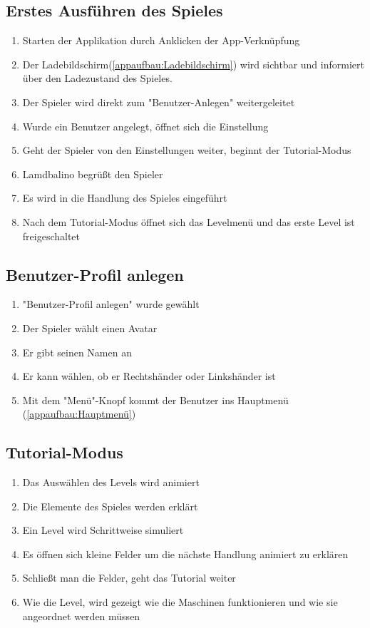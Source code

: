 \documentclass{scrartcl}
\begin{document}
\subsection{Erstes Ausführen des Spieles}
	\begin{enumerate}
		\item Starten der Applikation durch Anklicken der App-Verknüpfung
		\item Der Ladebildschirm(\ref{appaufbau:Ladebildschirm}) wird sichtbar und informiert über den Ladezustand des Spieles.
		\item Der Spieler wird direkt zum "Benutzer-Anlegen"  weitergeleitet
		\item Wurde ein Benutzer angelegt, öffnet sich die Einstellung
		\item Geht der Spieler von den Einstellungen weiter, beginnt der Tutorial-Modus
		\item Lamdbalino begrüßt den Spieler
		\item Es wird in die Handlung des Spieles eingeführt
		\item Nach dem Tutorial-Modus öffnet sich das Levelmenü und das erste Level ist freigeschaltet 
	\end{enumerate}
	
\subsection{Benutzer-Profil anlegen} \label{szenarien:ProfilAnlegen}
	\begin{enumerate}
		\item "Benutzer-Profil anlegen" wurde gewählt
		\item Der Spieler wählt einen Avatar
		\item Er gibt seinen Namen an
		\item Er kann wählen, ob er Rechtshänder oder Linkshänder ist
		\item Mit dem "Menü"-Knopf kommt der Benutzer ins Hauptmenü (\ref{appaufbau:Hauptmenü})
	\end{enumerate}	
	
\subsection{Tutorial-Modus}
	\begin{enumerate}
		\item Das Auswählen des Levels wird animiert
		\item Die Elemente des Spieles werden erklärt
		\item Ein Level wird Schrittweise simuliert
		\item Es öffnen sich kleine Felder um die nächste Handlung animiert zu erklären
		\item Schließt man die Felder, geht das Tutorial weiter
		\item Wie die Level, wird gezeigt wie die Maschinen funktionieren und wie sie angeordnet werden müssen
	\end{enumerate}
	
\end{document}
